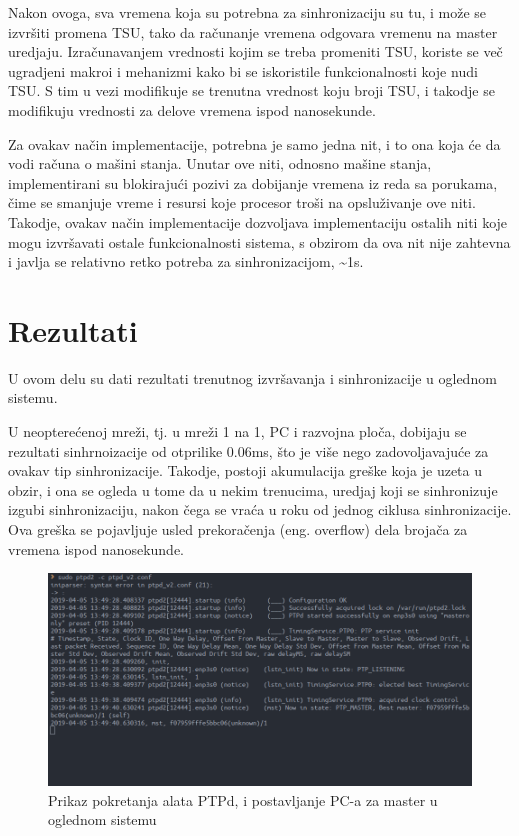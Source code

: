 \documentclass[a4paper,12pt, master]{etf}
\begin{document}
	Nakon ovoga, sva vremena koja su potrebna za sinhronizaciju su tu, i
	mo\v{z}e se izvr\v{s}iti promena TSU, tako da ra\v{c}unanje vremena
	odgovara vremenu na master uredjaju. Izra\v{c}unavanjem vrednosti kojim se
	treba promeniti TSU, koriste se ve\v{c} ugradjeni makroi i mehanizmi kako
	bi se iskoristile funkcionalnosti koje nudi TSU\@. S tim u vezi modifikuje
	se trenutna vrednost koju broji TSU, i takodje se modifikuju vrednosti za
	delove vremena ispod nanosekunde.

	Za ovakav na\v{c}in implementacije, potrebna je samo jedna nit, i to ona
	koja \'{c}e da vodi ra\v{c}una o ma\v{s}ini stanja. Unutar ove niti,
	odnosno ma\v{s}ine stanja, implementirani su blokiraju\'{c}i pozivi za
	dobijanje vremena iz reda sa porukama, \v{c}ime se smanjuje vreme i resursi
	koje procesor tro\v{s}i na opslu\v{z}ivanje ove niti. Takodje, ovakav
	na\v{c}in implementacije dozvoljava implementaciju ostalih niti koje mogu
	izvr\v{s}avati ostale funkcionalnosti sistema, s obzirom da ova nit nije
	zahtevna i javlja se relativno retko potreba za sinhronizacijom,
    \textasciitilde 1s.

	\section{Rezultati}

	U ovom delu su dati rezultati trenutnog izvr\v{s}avanja i sinhronizacije u
    oglednom sistemu.

	U neoptere\'{c}enoj mre\v{z}i, tj\@. u mre\v{z}i 1 na 1, PC i razvojna
	plo\v{c}a, dobijaju se rezultati sinhrnoizacije od otprilike 0.06ms,
	\v{s}to je vi\v{s}e nego zadovoljavaju\'{c}e za ovakav tip sinhronizacije.
	Takodje, postoji akumulacija gre\v{s}ke koja je uzeta u obzir, i ona se
	ogleda u tome da u nekim trenucima, uredjaj koji se	sinhronizuje izgubi
    sinhronizaciju, nakon \v{c}ega se vra\'{c}a u roku od jednog ciklusa
	sinhronizacije. Ova gre\v{s}ka se pojavljuje usled prekora\v{c}enja
	(eng\@. overflow) dela broja\v{c}a za vremena ispod nanosekunde.

	\begin{figure}[htb]
			\centering
			\includegraphics[scale=1.0]{../pic/ptpd_startup.png}
            \caption{Prikaz pokretanja alata PTPd, i postavljanje PC-a za
            master u oglednom sistemu}
			\label{fig:ptpd_startup}
	\end{figure}
\end{document}
